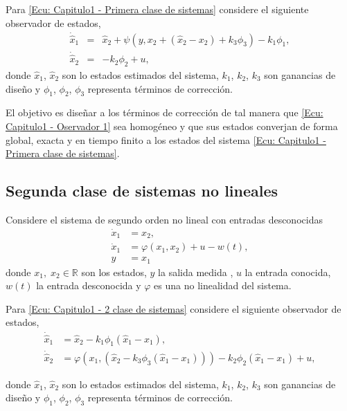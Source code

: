 \documentclass[11pt,letterpaper,twoside,openright]{report}
\begin{document}
	Para \eqref{Ecu: Capitulo1 - Primera clase de sistemas} considere el siguiente observador de estados,
	\begin{eqnarray}
	\label{Ecu: Capitulo1 - Oservador 1}
	\nonumber \dot{\hat{x}}_1&=&\hat{x}_2+\psi (y,x_2+(\hat{x}_2-x_2)+k_3\phi_3)-k_1\phi_1,\\
	\dot{\hat{x}}_2&=&-k_2\phi_2+u,
	\end{eqnarray}
	donde $\hat{x}_1$, $\hat{x}_2$ son lo estados estimados del sistema, $k_1$, $k_2$, $k_3$ son ganancias de diseño y $\phi_1$, $\phi_2$, $\phi_3$  representa  términos de corrección. 
	
	El objetivo es diseñar a los términos de corrección de tal manera que  \eqref{Ecu: Capitulo1 - Oservador 1} sea homogéneo y que sus estados  converjan  de forma  global, exacta y en tiempo finito a los estados del sistema \eqref{Ecu: Capitulo1 - Primera clase de sistemas}.
	
	\subsection{Segunda clase de sistemas no lineales}
	Considere el sistema de segundo orden no lineal con entradas desconocidas 
	\begin{equation}
	\label{Ecu: Capitulo1 - 2 clase de sistemas}
	\begin{split}
	\dot{x}_1&=x_2,\\
	\dot{x}_1&=\varphi(x_1,x_2)+u-w(t),\\
	y&=x_1
	\end{split}
	\end{equation}
	donde $x_1,\;x_2 \in \mathbb{R}$ son los estados, $y$  la salida medida , $u$  la entrada conocida, $w(t)$ la entrada desconocida y  $\varphi$ es una no linealidad del sistema.
	
	Para \eqref{Ecu: Capitulo1 - 2 clase de sistemas} considere el siguiente observador de estados,
	\begin{equation}
	\label{Ecu: Capitulo1 - Observador 2}
	\begin{split}
	\dot{\hat{x}}_1&=\hat{x}_2-k_1\phi_1(\hat{x}_1-x_1),\\
	\dot{\hat{x}}_2&=\varphi(x_1,(\hat{x}_2 -k_3\phi_3(\hat{x}_1-x_1)))-k_2\phi_2(\hat{x}_1-x_1)+u,
	\end{split}
	\end{equation}
	
	donde $\hat{x}_1$, $\hat{x}_2$ son lo estados estimados del sistema, $k_1$, $k_2$, $k_3$ son ganancias de diseño y $\phi_1$, $\phi_2$, $\phi_3$  representa  términos de corrección. 
	
\end{document}
